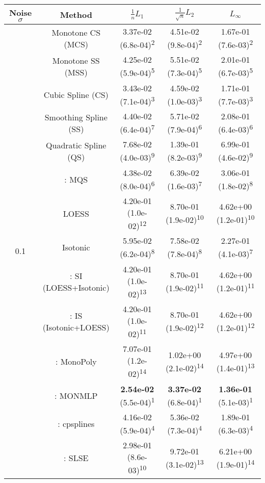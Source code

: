\begin{tabular}{ccccc}
\toprule
Noise $\sigma$ & Method&$\frac 1n L_1$&$\frac{1}{\sqrt n}L_2$&$L_\infty$\tabularnewline
\midrule
\multirow{14}{*}{0.1}&Monotone CS (MCS)& 3.37e-02 (6.8e-04)\textsuperscript{2}& 4.51e-02 (9.8e-04)\textsuperscript{2}& 1.67e-01 (7.6e-03)\textsuperscript{2}\tabularnewline
&Monotone SS (MSS)& 4.25e-02 (5.9e-04)\textsuperscript{5}& 5.51e-02 (7.3e-04)\textsuperscript{5}& 2.01e-01 (6.7e-03)\textsuperscript{5}\tabularnewline
&Cubic Spline (CS)& 3.43e-02 (7.1e-04)\textsuperscript{3}& 4.59e-02 (1.0e-03)\textsuperscript{3}& 1.71e-01 (7.7e-03)\textsuperscript{3}\tabularnewline
&Smoothing Spline (SS)& 4.40e-02 (6.4e-04)\textsuperscript{7}& 5.71e-02 (7.9e-04)\textsuperscript{6}& 2.08e-01 (6.4e-03)\textsuperscript{6}\tabularnewline
&Quadratic Spline (QS)& 7.68e-02 (4.0e-03)\textsuperscript{9}& 1.39e-01 (8.2e-03)\textsuperscript{9}& 6.99e-01 (4.6e-02)\textsuperscript{9}\tabularnewline
&\textcite{heMonotoneBsplineSmoothing1998}: MQS& 4.38e-02 (8.0e-04)\textsuperscript{6}& 6.39e-02 (1.6e-03)\textsuperscript{7}& 3.06e-01 (1.8e-02)\textsuperscript{8}\tabularnewline
&LOESS& 4.20e-01 (1.0e-02)\textsuperscript{12}& 8.70e-01 (1.9e-02)\textsuperscript{10}& 4.62e+00 (1.2e-01)\textsuperscript{10}\tabularnewline
&Isotonic& 5.95e-02 (6.2e-04)\textsuperscript{8}& 7.58e-02 (7.8e-04)\textsuperscript{8}& 2.27e-01 (4.1e-03)\textsuperscript{7}\tabularnewline
&\textcite{mammenEstimatingSmoothMonotone1991}: SI (LOESS+Isotonic)& 4.20e-01 (1.0e-02)\textsuperscript{13}& 8.70e-01 (1.9e-02)\textsuperscript{11}& 4.62e+00 (1.2e-01)\textsuperscript{11}\tabularnewline
&\textcite{mammenEstimatingSmoothMonotone1991}: IS (Isotonic+LOESS)& 4.20e-01 (1.0e-02)\textsuperscript{11}& 8.70e-01 (1.9e-02)\textsuperscript{12}& 4.62e+00 (1.2e-01)\textsuperscript{12}\tabularnewline
&\textcite{murrayFastFlexibleMethods2016}: MonoPoly& 7.07e-01 (1.2e-02)\textsuperscript{14}& 1.02e+00 (2.1e-02)\textsuperscript{14}& 4.97e+00 (1.4e-01)\textsuperscript{13}\tabularnewline
&\textcite{cannonMonmlpMultilayerPerceptron2017}: MONMLP& \textbf{2.54e-02} (5.5e-04)\textsuperscript{1}& \textbf{3.37e-02} (6.8e-04)\textsuperscript{1}& \textbf{1.36e-01} (5.1e-03)\textsuperscript{1}\tabularnewline
&\textcite{navarro-garciaConstrainedSmoothingOutofrange2023}: cpsplines& 4.16e-02 (5.9e-04)\textsuperscript{4}& 5.36e-02 (7.3e-04)\textsuperscript{4}& 1.89e-01 (6.3e-03)\textsuperscript{4}\tabularnewline
&\textcite{groeneboomConfidenceIntervalsMonotone2023}: SLSE& 2.98e-01 (8.6e-03)\textsuperscript{10}& 9.72e-01 (3.1e-02)\textsuperscript{13}& 6.21e+00 (1.9e-01)\textsuperscript{14}\tabularnewline

\end{tabular}
